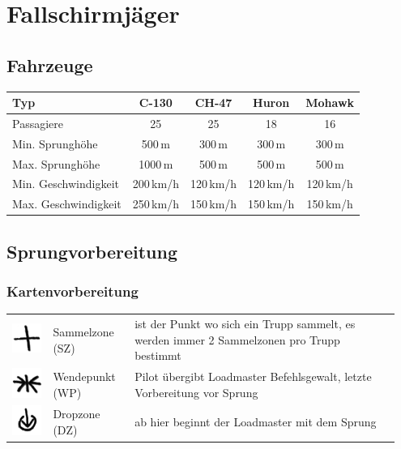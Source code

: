 \pagebreak
\section{Fallschirmjäger}

\subsection{Fahrzeuge}
\begin{longtable}{lcccc} 
	\toprule
	Typ & C-130 & CH-47 &	Huron	&	Mohawk \\ 
	\midrule
	Passagiere 	&	25 	&	25 	&	18 	&	16 \\ 
	Min. Sprunghöhe	& 500\,m 	& 300\,m 	&	300\,m	&	300\,m	\\
	Max. Sprunghöhe	&	1000\,m 	&	500\,m 	&	500\,m	&	500\,m \\
	Min. Geschwindigkeit	& 	200\,km/h	&	120\,km/h	&	120\,km/h	&	120\,km/h	\\ 
	Max. Geschwindigkeit	& 	250\,km/h	&	150\,km/h &	150\,km/h &	150\,km/h \\
	\bottomrule 
\end{longtable}

\subsection{Sprungvorbereitung}
\subsubsection*{Kartenvorbereitung}
\begin{tabular}{C{0.1\linewidth}m{0.2\linewidth} m{0.65\linewidth}}
	\includegraphics[scale=0.8]{./img/fortgeschrittenes/fallschirmspringen/sammelzone}	& Sammelzone (SZ)	& ist der Punkt wo sich ein Trupp sammelt, es werden immer 2 Sammelzonen pro Trupp bestimmt\\
	\includegraphics[scale=0.8]{./img/fortgeschrittenes/fallschirmspringen/wendepunkt} 	& 	Wendepunkt (WP) & Pilot übergibt Loadmaster Befehlsgewalt, letzte Vorbereitung vor Sprung\\
	\includegraphics[scale=0.8]{./img/fortgeschrittenes/fallschirmspringen/dropzone}	& Dropzone (DZ) & ab hier beginnt der Loadmaster mit dem Sprung
\end{tabular}

